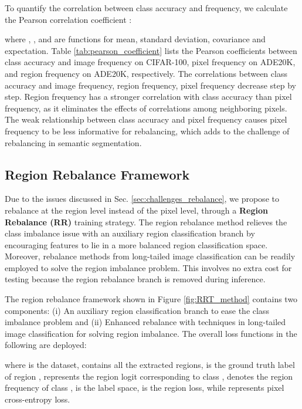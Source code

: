\documentclass[final]{cvpr}
\begin{document}
To quantify the correlation between class accuracy and frequency, we calculate the Pearson correlation coefficient \cite{benesty2009pearson}:

where , ,  and  are functions for mean, standard deviation, covariance and expectation.
Table \ref{tab:pearson_coefficient} lists the Pearson coefficients between class accuracy and image frequency on CIFAR-100, pixel frequency on ADE20K, and region frequency on ADE20K, respectively. The correlations between class accuracy and image frequency, region frequency, pixel frequency decrease step by step. Region frequency has a stronger correlation with class accuracy than pixel frequency, as it eliminates the effects of correlations among neighboring pixels. 
The weak relationship between class accuracy and pixel frequency causes pixel frequency to be less informative for rebalancing, which adds to the challenge of rebalancing in semantic segmentation.


\vspace{-0.1in}
\subsection{Region Rebalance Framework}
Due to the issues discussed in Sec. \ref{sec:challenges_rebalance},
we propose to rebalance at the region level instead of the pixel level, through a \textbf{Region Rebalance (RR)} training strategy. The region rebalance method relieves the class imbalance issue with an auxiliary region classification branch by encouraging features to lie in a more balanced region classification space. Moreover, rebalance methods from long-tailed image classification can be readily employed to solve the region imbalance problem. This involves no extra cost for testing because the region rebalance branch is removed during inference.


The region rebalance framework shown in Figure \ref{fig:RRT_method} contains two components: 
(i) An auxiliary region classification branch to ease the class imbalance problem and (ii) Enhanced rebalance with techniques in long-tailed image classification for solving region imbalance. The overall loss functions in the following are deployed:

\vspace{-0.1in}

where  is the dataset,  contains all the extracted regions,  is the ground truth label of region ,  represents the region logit corresponding to class ,  denotes the region frequency of class ,  is the label space,  is the region loss, while  represents pixel cross-entropy loss. 
\end{document}
